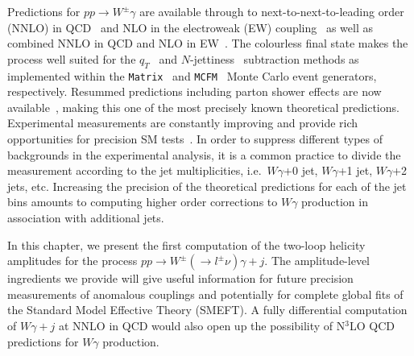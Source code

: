 \documentclass[main.tex]{subfiles}
\begin{document}
Predictions for $pp\to W^\pm\gamma$ are available through to next-to-next-to-leading order (NNLO) in
QCD~\cite{Gehrmann:2011ab,Grazzini:2015nwa,Campbell:2021mlr} and NLO in the electroweak (EW)
coupling~\cite{Accomando:2005ra,Denner:2014bna} as well as combined NNLO in QCD and NLO in EW~\cite{Grazzini:2019jkl}. The colourless final state makes the process well
suited for the $q_T$~\cite{Catani:2007vq} and $N$-jettiness~\cite{Boughezal:2015aha,Gaunt:2015pea} subtraction methods as implemented within the \texttt{Matrix}~\cite{Grazzini:2017mhc}
and \texttt{MCFM}~\cite{Boughezal:2016wmq} Monte Carlo event generators, respectively. Resummed predictions including parton shower
effects are now available~\cite{Cridge:2021hfr}, making this one of the most precisely known
theoretical predictions. Experimental measurements are constantly improving and provide rich
opportunities for precision SM tests~\cite{CMS:2021foa,CMS:2021cxr}.
In order to suppress different types of backgrounds in the experimental analysis, it is a common
practice to divide the measurement according to the jet multiplicities, i.e.\  $W\gamma$+0 jet,
$W\gamma$+1 jet, $W\gamma$+2 jets, etc. Increasing the precision of the theoretical predictions for
each of the jet bins amounts to computing higher order corrections to $W\gamma$ production in association
with additional jets.

In this chapter, we present the first computation of the two-loop helicity amplitudes for the process $pp\to W^\pm(\to l^\pm\nu)\gamma + j$. The amplitude-level ingredients we provide will give useful information for future precision 
measurements of anomalous couplings and potentially for complete global fits of the Standard Model
Effective Theory (SMEFT). A fully differential computation of $W\gamma+j$ at NNLO in QCD would also
open up the possibility of N${}^3$LO QCD predictions for $W\gamma$ production.

\end{document}
